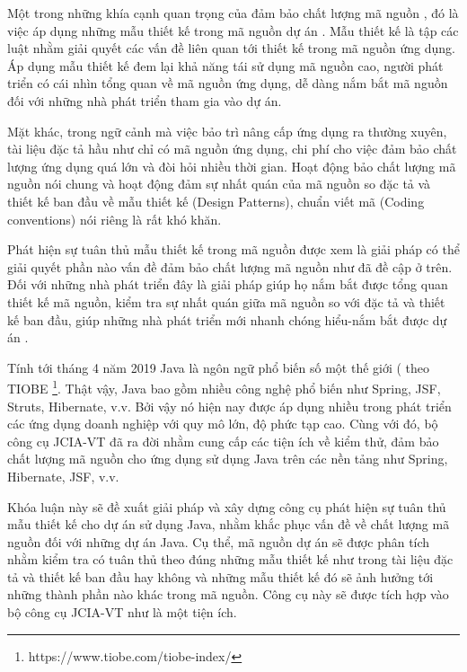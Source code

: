 \documentclass[12pt]{report}
\begin{document}
\noindent Một trong những khía cạnh quan trọng của đảm bảo chất lượng mã nguồn \cite{code-review}, đó là việc áp dụng những mẫu thiết kế trong mã nguồn dự án \cite{orucc2016}. Mẫu thiết kế là tập các luật nhằm giải quyết các vấn đề liên quan tới thiết kế trong mã nguồn ứng dụng. Áp dụng mẫu thiết kế đem lại khả năng tái sử dụng mã nguồn cao, người phát triển có cái nhìn tổng quan về mã nguồn ứng dụng, dễ dàng nắm bắt mã nguồn đối với những nhà phát triển tham gia vào dự án.

\noindent Mặt khác, trong ngữ cảnh mà việc bảo trì nâng cấp ứng dụng ra thường xuyên, tài liệu đặc tả hầu như chỉ có mã nguồn ứng dụng, chi phí cho việc đảm bảo chất lượng ứng dụng quá lớn và đòi hỏi nhiều thời gian. Hoạt động bảo chất lượng mã nguồn nói chung và hoạt động đảm sự nhất quán của mã nguồn so đặc tả và thiết kế ban đầu về mẫu thiết kế \cite{go4} (Design Patterns), chuẩn viết mã (Coding conventions) nói riêng là rất khó khăn.

\noindent Phát hiện sự tuân thủ mẫu thiết kế trong mã nguồn được xem là giải pháp có thể giải quyết phần nào vấn đề đảm bảo chất lượng mã nguồn như đã đề cập ở trên. Đối với những nhà phát triển đây là giải pháp giúp họ nắm bắt được tổng quan thiết kế mã nguồn, kiểm tra sự nhất quán giữa mã nguồn so với đặc tả và thiết kế ban đầu, giúp những nhà phát triển mới nhanh chóng hiểu-nắm bắt được dự án \cite{orucc2016}.

\noindent Tính tới tháng 4 năm 2019 Java là ngôn ngữ phổ biến số một thế giới ( theo TIOBE \footnote{https://www.tiobe.com/tiobe-index/}. Thật vậy, Java bao gồm nhiều công nghệ phổ biến như Spring, JSF, Struts, Hibernate, v.v. Bởi vậy nó hiện nay được áp dụng nhiều trong phát triển các ứng dụng doanh nghiệp với quy mô lớn, độ phức tạp cao. Cùng với đó, bộ công cụ JCIA-VT đã ra đời nhằm cung cấp các tiện ích về kiểm thử, đảm bảo chất lượng mã nguồn cho ứng dụng sử dụng Java trên các nền tảng như Spring, Hibernate, JSF, v.v.

\noindent Khóa luận này sẽ đề xuất giải pháp và xây dựng công cụ phát hiện sự tuân thủ mẫu thiết kế cho dự án sử dụng Java, nhằm khắc phục vấn đề về chất lượng mã nguồn đối với những dự án Java. Cụ thể, mã nguồn dự án sẽ được phân tích nhằm kiểm tra có tuân thủ theo đúng những mẫu thiết kế như trong tài liệu đặc tả và thiết kế ban đầu hay không và những mẫu thiết kế đó sẽ ảnh hưởng tới những thành phần nào khác trong mã nguồn. Công cụ này sẽ được tích hợp vào bộ công cụ JCIA-VT như là một tiện ích.
\end{document}

